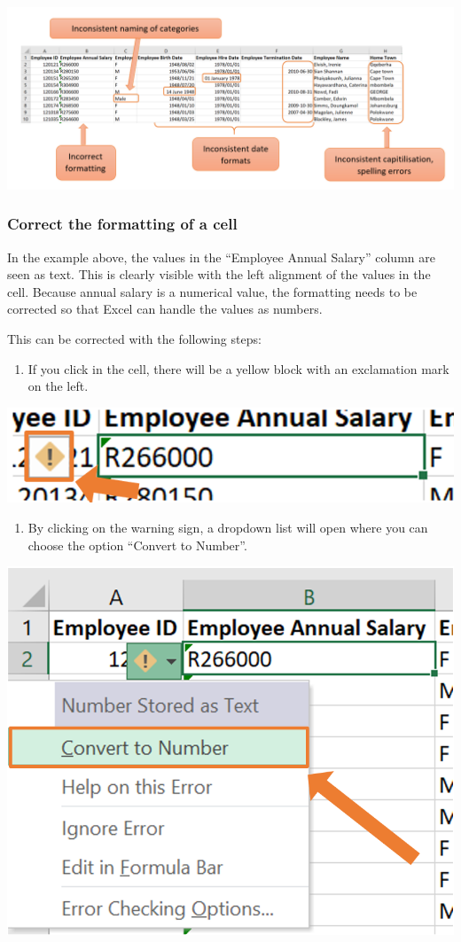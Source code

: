 \documentclass[
]{book}
\providecommand{\tightlist}{%
  \setlength{\itemsep}{0pt}\setlength{\parskip}{0pt}}
\begin{document}
\begin{center}\includegraphics[width=0.7\linewidth]{Figures/cleaning_overview} \end{center}

\subsubsection*{Correct the formatting of a cell}\label{correct-the-formatting-of-a-cell}

In the example above, the values in the ``Employee Annual Salary'' column are seen as text. This is clearly visible with the left alignment of the values in the cell. Because annual salary is a numerical value, the formatting needs to be corrected so that Excel can handle the values as numbers.

This can be corrected with the following steps:

\begin{enumerate}
\def\labelenumi{\arabic{enumi}.}
\tightlist
\item
  If you click in the cell, there will be a yellow block with an exclamation mark on the left.
\end{enumerate}

\begin{center}\includegraphics[width=0.4\linewidth]{Figures/cleaning_formatting_1} \end{center}

\begin{enumerate}
\def\labelenumi{\arabic{enumi}.}
\setcounter{enumi}{1}
\tightlist
\item
  By clicking on the warning sign, a dropdown list will open where you can choose the option ``Convert to Number''.
\end{enumerate}

\begin{center}\includegraphics[width=0.4\linewidth]{Figures/cleaning_formatting_2} \end{center}
\end{document}
